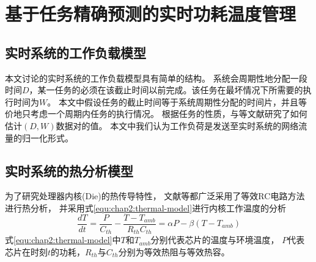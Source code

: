 


\chapter{基于任务精确预测的实时功耗温度管理}
\label{cha:DPTM}

\section{实时系统的工作负载模型}
\label{sec:workload}
本文讨论的实时系统的工作负载模型具有简单的结构。 系统会周期性地分配一段时间$D$，某一任务的必须在该截止时间以前完成。该任务在最坏情况下所需要的执行时间为$W$。 本文中假设任务的截止时间等于系统周期性分配的时间片，并且等价地只考虑一个周期内任务的执行情况。 根据任务的性质，与等文献研究了如何估计$(D,W)$数据对的值。
本文中我们认为工作负荷是发送至实时系统的网络流量的归一化形式。


\section{实时系统的热分析模型}
\label{sec:thermal}
为了研究处理器内核(Die)的热传导特性， 文献等都广泛采用了等效RC电路方法进行热分析， 并采用式\ref{equ:chap2:thermal-model}进行内核工作温度的分析
\begin{equation}
\label{equ:chap2:thermal-model}
\frac{dT}{dt} = \frac{P}{C_{th}}-\frac{T-T_{amb}}{R_{th}C_{th}} = \alpha P -\beta (T-T_{amb})
\end{equation}
式\ref{equ:chap2:thermal-model}中$T$和$T_{amb}$分别代表芯片的温度与环境温度， $P$代表芯片在时刻$t$的功耗，$R_{th}$与$C_{th}$分别为等效热阻与等效热容。

